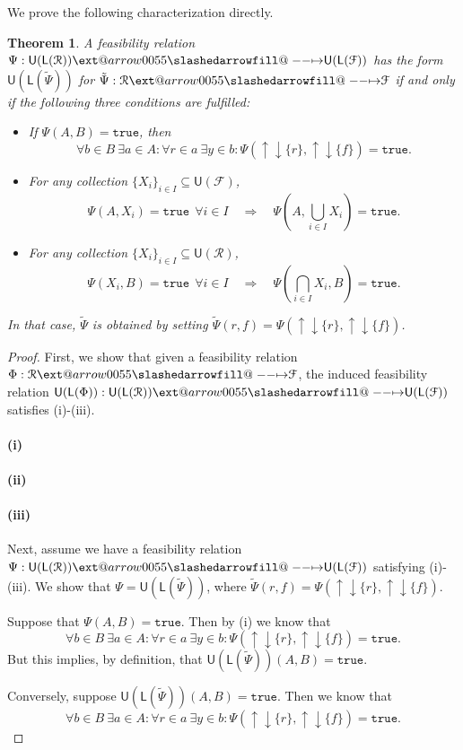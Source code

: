 \documentclass[12pt]{article}
\makeatletter
\theoremstyle{definition}
\theoremstyle{plain}
\theoremstyle{plain}
\theoremstyle{plain}
\newtheorem{theorem}{Theorem}[section]
\theoremstyle{plain}
\theoremstyle{remark}
\theoremstyle{remark}
\newcommand{\mc}[1]{\mathcal{#1}}
\newcommand{\sub}{\subseteq}
\newcommand{\low}{\mathsf{L}}
\newcommand{\upper}{\mathsf{U}}
\newcommand{\true}{\mathtt{true}}
\newcommand{\upc}[1]{{\uparrow #1}}
\newcommand{\lwc}[1]{{\downarrow #1}}
\def\slashedarrowfill@#1#2#3#4#5{%
	$\m@th\thickmuskip0mu\medmuskip\thickmuskip\thinmuskip\thickmuskip
	\relax#5#1\mkern-7mu%
	\cleaders\hbox{$#5\mkern-2mu#2\mkern-2mu$}\hfill
	\mathclap{#3}\mathclap{#2}%
	\cleaders\hbox{$#5\mkern-2mu#2\mkern-2mu$}\hfill
	\mkern-7mu#4$%
}
\def\rightslashedarrowfill@{%
	\slashedarrowfill@\relbar\relbar\mapstochar\rightarrow}
\newcommand\xslashedrightarrow[2][]{%
	\ext@arrow 0055{\rightslashedarrowfill@}{#1}{#2}}
\makeatother
\begin{document}
We prove the following characterization directly.

\begin{theorem}\label{thm:induction}
	A feasibility relation $\Psi: \upper(\low(\mc{R})) \xslashedrightarrow{} \upper(\low(\mc{F}))$ has the form $\upper(\low(\tilde\Psi))$ for $\tilde\Psi: \mc{R} \xslashedrightarrow{} \mc{F}$ if and only if the following three conditions are fulfilled:
	\begin{itemize}
	\item[(i)] If $\Psi(A,B)=\true$, then
	$$\forall b \in B \: \exists a \in A : \forall r \in a \: \exists y \in b: \Psi(\upc{\lwc{\{r\}}},\upc{\lwc{\{f\}}})=\true.$$
	\item[(ii)] For any collection $\{X_i\}_{i \in I} \sub \upper(\mc{F})$,
	$$\Psi(A,X_i) = \true \:\: \forall i \in I \quad \Rightarrow \quad \Psi(A,\bigcup_{i \in I} X_i) = \true.$$
	\item[(iii)] For any collection $\{X_i\}_{i \in I} \sub \upper(\mc{R})$,
	$$\Psi(X_i,B) = \true \:\: \forall i \in I \quad \Rightarrow \quad \Psi(\bigcap_{i \in I}X_i,B) = \true.$$
	\end{itemize}
	In that case, $\tilde\Psi$ is obtained by setting $\tilde\Psi(r,f) = \Psi(\upc{\lwc{\{r\}}},\upc{\lwc{\{f\}}})$.
\end{theorem}
\begin{proof}
	First, we show that given a feasibility relation $\Phi: \mc{R} \xslashedrightarrow{} \mc{F}$, the induced feasibility relation $\upper(\low(\Phi)):  \upper(\low(\mc{R})) \xslashedrightarrow{} \upper(\low(\mc{F}))$ satisfies (i)-(iii).
	
	\paragraph{(i)}

	\paragraph{(ii)}
	
	\paragraph{(iii)}
	
	Next, assume we have a feasibility relation $\Psi: \upper(\low(\mc{R})) \xslashedrightarrow{} \upper(\low(\mc{F}))$ satisfying (i)-(iii). We show that $\Psi = \upper(\low(\tilde\Psi))$, where $\tilde\Psi(r,f) = \Psi(\upc{\lwc{\{r\}}},\upc{\lwc{\{f\}}})$.
	
	Suppose that $\Psi(A,B) = \true$. Then by (i) we know that $$\forall b \in B \: \exists a \in A : \forall r \in a \: \exists y \in b: \Psi(\upc{\lwc{\{r\}}},\upc{\lwc{\{f\}}})=\true.$$ But this implies, by definition, that $\upper(\low(\tilde\Psi))(A,B) = \true$.
	
	Conversely, suppose $\upper(\low(\tilde\Psi))(A,B) = \true$. Then we know that
	$$\forall b \in B \: \exists a \in A : \forall r \in a \: \exists y \in b: \Psi(\upc{\lwc{\{r\}}},\upc{\lwc{\{f\}}})=\true.$$
	
\end{proof}
\end{document}
